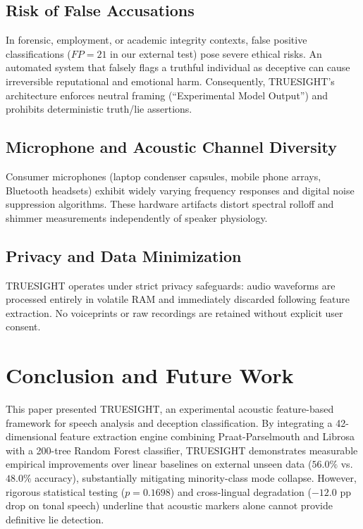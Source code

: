 \documentclass[conference]{IEEEtran}
\begin{document}
\subsection{Risk of False Accusations}
In forensic, employment, or academic integrity contexts, false positive classifications ($FP=21$ in our external test) pose severe ethical risks. An automated system that falsely flags a truthful individual as deceptive can cause irreversible reputational and emotional harm. Consequently, TRUESIGHT's architecture enforces neutral framing (``Experimental Model Output'') and prohibits deterministic truth/lie assertions.

\subsection{Microphone and Acoustic Channel Diversity}
Consumer microphones (laptop condenser capsules, mobile phone arrays, Bluetooth headsets) exhibit widely varying frequency responses and digital noise suppression algorithms. These hardware artifacts distort spectral rolloff and shimmer measurements independently of speaker physiology.

\subsection{Privacy and Data Minimization}
TRUESIGHT operates under strict privacy safeguards: audio waveforms are processed entirely in volatile RAM and immediately discarded following feature extraction. No voiceprints or raw recordings are retained without explicit user consent.

\section{Conclusion and Future Work}
This paper presented TRUESIGHT, an experimental acoustic feature-based framework for speech analysis and deception classification. By integrating a 42-dimensional feature extraction engine combining Praat-Parselmouth and Librosa with a 200-tree Random Forest classifier, TRUESIGHT demonstrates measurable empirical improvements over linear baselines on external unseen data ($56.0\%$ vs. $48.0\%$ accuracy), substantially mitigating minority-class mode collapse. However, rigorous statistical testing ($p = 0.1698$) and cross-lingual degradation ($-12.0$ pp drop on tonal speech) underline that acoustic markers alone cannot provide definitive lie detection.
\end{document}
